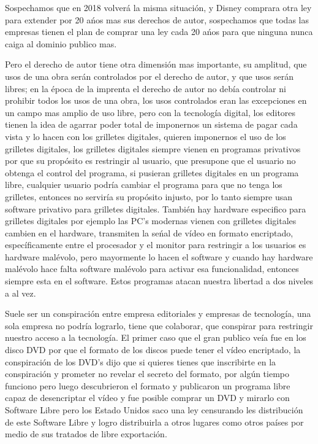 \begin{multicols}{2}
Sospechamos que en 2018  volverá la misma situación, y Disney comprara otra ley para extender por 20 ańos mas sus derechos de autor, sospechamos que todas las empresas tienen el plan de comprar una ley cada 20 ańos para que ninguna nunca caiga al dominio publico mas.

Pero el derecho de autor tiene otra dimensión mas importante, su amplitud, que usos de una obra serán controlados por el derecho de autor, y que usos serán libres; en la época de la imprenta el derecho de autor no debía controlar ni prohibir todos los usos de una obra, los usos controlados eran las excepciones en un campo mas amplio de uso libre, pero con la tecnología digital, los editores tienen la idea de agarrar poder total de imponernos un sistema de pagar cada vista y lo hacen con los grilletes digitales, quieren imponernos el uso de los grilletes digitales, los grilletes digitales siempre vienen en programas privativos por que su propósito es restringir al usuario, que presupone que el usuario no obtenga el control del programa, si pusieran grilletes digitales en un programa libre, cualquier usuario podría cambiar el programa para que no tenga los grilletes, entonces no serviría su propósito injusto, por lo tanto siempre usan software privativo para grilletes digitales. También hay hardware especifico para grilletes digitales por ejemplo las PC's modernas vienen con grilletes digitales cambien en el hardware, transmiten la seńal de vídeo en formato encriptado, específicamente entre el procesador y el monitor para restringir a los usuarios es hardware malévolo, pero mayormente lo hacen el software y cuando hay hardware malévolo hace falta software malévolo  para activar esa funcionalidad, entonces siempre esta en el software. Estos programas atacan nuestra libertad a dos niveles a al vez.

Suele ser un conspiración entre empresa editoriales y empresas de tecnología, una sola empresa no podría lograrlo, tiene que colaborar, que conspirar para restringir nuestro acceso a la tecnología. El primer caso que el gran publico veía fue en los disco DVD por que el formato de los discos puede tener el vídeo encriptado, la conspiración de los DVD's dijo que si quieres tienes que inscribirte en la conspiración y prometer no revelar el secreto del formato, por algún tiempo funciono pero luego descubrieron el formato y publicaron un programa libre capaz de desencriptar el vídeo y fue posible comprar un DVD y mirarlo con Software Libre pero los Estado Unidos saco una ley censurando les distribución de este Software Libre y logro distribuirla a otros lugares como otros países por medio de sus tratados de libre exportación.


\end{multicols}
